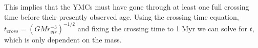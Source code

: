 This implies that the YMCs must have gone through at least one full crossing time before their presently observed age. Using the crossing time equation, $t_{cross}=(GMr_{vir}^{-3})^{-1/2}$ and fixing the crossing time to 1 Myr we can solve for $t$, which is only dependent on the mass. \cite{Arce_1999}